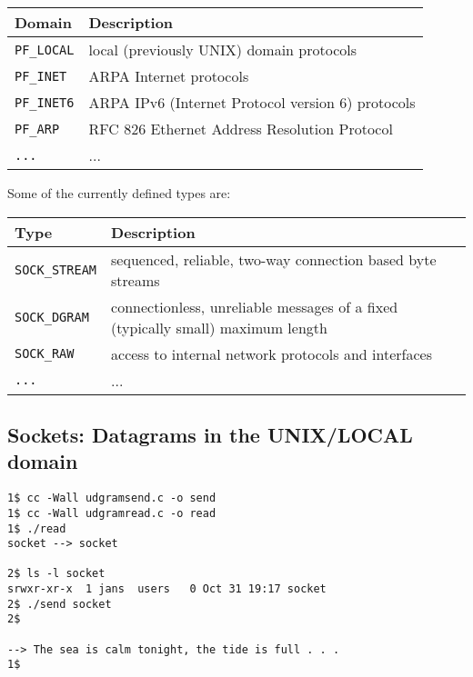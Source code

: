 \documentclass[xga]{xdvislides}
\begin{document}
\small
\begin{tabular}{| l | l |}
	\hline
	{\bf Domain} & {\bf Description} \\
	\hline
	{\tt PF\_LOCAL} 	& 	local (previously UNIX) domain protocols \\
	{\tt PF\_INET}		&	ARPA Internet protocols \\
	{\tt PF\_INET6}		&	ARPA IPv6 (Internet Protocol version 6) protocols \\
	{\tt PF\_ARP}		&	RFC 826 Ethernet Address Resolution Protocol\\
	{\tt ...}		&	...\\
	\hline
\end{tabular}
\Normalsize
\vspace{.5in}

Some of the currently defined types are:
\\

\small
\begin{tabular}{| l | l |}
	\hline
	{\bf Type}		&	{\bf Description} \\
	\hline
	{\tt SOCK\_STREAM}	&	sequenced, reliable, two-way connection based byte streams \\
	{\tt SOCK\_DGRAM}	&	connectionless, unreliable messages of a fixed (typically small)
							maximum length \\
	{\tt SOCK\_RAW}		&	access to internal network protocols and interfaces \\
	{\tt ...}		&	... \\
	\hline
\end{tabular}
\Normalsize

\subsection{Sockets: Datagrams in the UNIX/LOCAL domain}
\begin{verbatim}
1$ cc -Wall udgramsend.c -o send
1$ cc -Wall udgramread.c -o read
1$ ./read
socket --> socket

2$ ls -l socket
srwxr-xr-x  1 jans  users   0 Oct 31 19:17 socket
2$ ./send socket
2$

--> The sea is calm tonight, the tide is full . . .
1$
\end{verbatim}
\vfill
\end{document}
